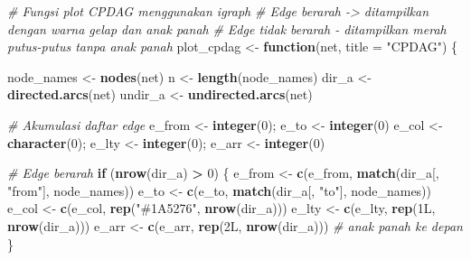 \documentclass[
  11pt,
]{article}
\newenvironment{Shaded}{\begin{snugshade}}{\end{snugshade}}
\newcommand{\AttributeTok}[1]{\textcolor[rgb]{0.13,0.29,0.53}{#1}}
\newcommand{\CommentTok}[1]{\textcolor[rgb]{0.56,0.35,0.01}{\textit{#1}}}
\newcommand{\ControlFlowTok}[1]{\textcolor[rgb]{0.13,0.29,0.53}{\textbf{#1}}}
\newcommand{\DataTypeTok}[1]{\textcolor[rgb]{0.13,0.29,0.53}{#1}}
\newcommand{\DecValTok}[1]{\textcolor[rgb]{0.00,0.00,0.81}{#1}}
\newcommand{\FunctionTok}[1]{\textcolor[rgb]{0.13,0.29,0.53}{\textbf{#1}}}
\newcommand{\NormalTok}[1]{#1}
\newcommand{\OtherTok}[1]{\textcolor[rgb]{0.56,0.35,0.01}{#1}}
\newcommand{\SpecialCharTok}[1]{\textcolor[rgb]{0.81,0.36,0.00}{\textbf{#1}}}
\newcommand{\StringTok}[1]{\textcolor[rgb]{0.31,0.60,0.02}{#1}}
\begin{document}
\begin{Shaded}
\begin{Highlighting}[]
\CommentTok{\# Fungsi plot CPDAG menggunakan igraph}
\CommentTok{\# Edge berarah  {-}\textgreater{} ditampilkan dengan warna gelap dan anak panah}
\CommentTok{\# Edge tidak berarah {-} ditampilkan merah putus{-}putus tanpa anak panah}
\NormalTok{plot\_cpdag }\OtherTok{\textless{}{-}} \ControlFlowTok{function}\NormalTok{(net, }\AttributeTok{title =} \StringTok{"CPDAG"}\NormalTok{) \{}

\NormalTok{  node\_names }\OtherTok{\textless{}{-}} \FunctionTok{nodes}\NormalTok{(net)}
\NormalTok{  n          }\OtherTok{\textless{}{-}} \FunctionTok{length}\NormalTok{(node\_names)}
\NormalTok{  dir\_a      }\OtherTok{\textless{}{-}} \FunctionTok{directed.arcs}\NormalTok{(net)}
\NormalTok{  undir\_a    }\OtherTok{\textless{}{-}} \FunctionTok{undirected.arcs}\NormalTok{(net)}

  \CommentTok{\# Akumulasi daftar edge}
\NormalTok{  e\_from }\OtherTok{\textless{}{-}} \FunctionTok{integer}\NormalTok{(}\DecValTok{0}\NormalTok{); e\_to }\OtherTok{\textless{}{-}} \FunctionTok{integer}\NormalTok{(}\DecValTok{0}\NormalTok{)}
\NormalTok{  e\_col  }\OtherTok{\textless{}{-}} \FunctionTok{character}\NormalTok{(}\DecValTok{0}\NormalTok{); e\_lty }\OtherTok{\textless{}{-}} \FunctionTok{integer}\NormalTok{(}\DecValTok{0}\NormalTok{); e\_arr }\OtherTok{\textless{}{-}} \FunctionTok{integer}\NormalTok{(}\DecValTok{0}\NormalTok{)}

  \CommentTok{\# Edge berarah}
  \ControlFlowTok{if}\NormalTok{ (}\FunctionTok{nrow}\NormalTok{(dir\_a) }\SpecialCharTok{\textgreater{}} \DecValTok{0}\NormalTok{) \{}
\NormalTok{    e\_from }\OtherTok{\textless{}{-}} \FunctionTok{c}\NormalTok{(e\_from, }\FunctionTok{match}\NormalTok{(dir\_a[, }\StringTok{"from"}\NormalTok{], node\_names))}
\NormalTok{    e\_to   }\OtherTok{\textless{}{-}} \FunctionTok{c}\NormalTok{(e\_to,   }\FunctionTok{match}\NormalTok{(dir\_a[, }\StringTok{"to"}\NormalTok{],   node\_names))}
\NormalTok{    e\_col  }\OtherTok{\textless{}{-}} \FunctionTok{c}\NormalTok{(e\_col,  }\FunctionTok{rep}\NormalTok{(}\StringTok{"\#1A5276"}\NormalTok{, }\FunctionTok{nrow}\NormalTok{(dir\_a)))}
\NormalTok{    e\_lty  }\OtherTok{\textless{}{-}} \FunctionTok{c}\NormalTok{(e\_lty,  }\FunctionTok{rep}\NormalTok{(}\DecValTok{1}\DataTypeTok{L}\NormalTok{,        }\FunctionTok{nrow}\NormalTok{(dir\_a)))}
\NormalTok{    e\_arr  }\OtherTok{\textless{}{-}} \FunctionTok{c}\NormalTok{(e\_arr,  }\FunctionTok{rep}\NormalTok{(}\DecValTok{2}\DataTypeTok{L}\NormalTok{,        }\FunctionTok{nrow}\NormalTok{(dir\_a)))   }\CommentTok{\# anak panah ke depan}
\NormalTok{  \}}


\end{Highlighting}
\end{Shaded}
\end{document}
